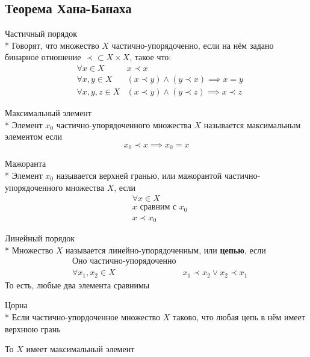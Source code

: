 \subsection{Теорема Хана-Банаха}

\begin{dfn}{Частичный порядок}\\*
  Говорят, что множество $X$
  частично-упорядоченно,
  если на нём задано бинарное отношение
  $\prec\subset X\times X$, такое что:
  \begin{align*}
    & \forall x\in X & x\prec x \\
    & \forall x,y\in X & (x\prec y)\land (y\prec x) \implies x=y\\
    & \forall x,y,z\in X & (x\prec y)\land (y\prec z) \implies x\prec z
  \end{align*}
\end{dfn}

\begin{dfn}{Максимальный элемент}\\*
  Элемент $x_0$ частично-упорядоченного множества $X$
  называется максимальным элементом если
  $$x_0\prec x \implies x_0=x$$
\end{dfn}

\begin{dfn}{Мажоранта}\\*
  Элемент $x_0$ называется
  верхней гранью, или мажорантой
  частично-упорядоченного множества $X$,
  если
  \begin{align*}
    & \forall x\in X\\
    & x \text{ сравним с } x_0 \\
    & x \prec x_0
  \end{align*}
\end{dfn}

\begin{dfn}{Линейный порядок}\\*
  Множество $X$ называется линейно-упорядоченным,
  или \textbf{цепью}, если
  \begin{align*}
    & \text{Оно частично-упорядоченно} \\
    & \forall x_1,x_2\in X & x_1\prec x_2 \lor x_2\prec x_1
  \end{align*}
  То есть, любые два элемента сравнимы
\end{dfn}

\begin{lemma}{Цорна}\\*
  Если частично-упордоченное множество $X$
  таково, что любая цепь в нём имеет верхнюю грань

  То $X$ имеет максимальный элемент
\end{lemma}

